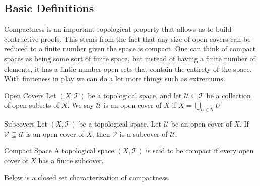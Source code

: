 \documentclass[a4paper]{article}
\begin{document}
\subsection{Basic Definitions}
Compactness is an important topological property that allows us to build contructive proofs. This stems from the fact that any size of open covers can be reduced to a finite number given the space is compact. One can think of compact spaces as being some sort of finite space, but instead of having a finite number of elements, it has a fintie number open sets that contain the entirety of the space. With finiteness in play we can do a lot more things such as extremums. 

\begin{defn}{Open Covers}{} Let $(X,\mathcal{T})$ be a topological space, and let $\mathcal{U}\subseteq\mathcal{T}$ be a collection of open subsets of $X$. We say $\mathcal{U}$ is an open cover of $X$ if $X=\bigcup_{U\in\mathcal{U}}U$
\end{defn}

\begin{defn}{Subcovers}{} Let $(X,\mathcal{T})$ be a topological space. Let $\mathcal{U}$ be an open cover of $X$. If $\mathcal{V}\subseteq\mathcal{U}$ is an open cover of $X$, then $\mathcal{V}$ is a subcover of $\mathcal{U}$. 
\end{defn}

\begin{defn}{Compact Space}{} A topological space $(X,\mathcal{T})$ is said to be compact if every open cover of $X$ has a finite subcover. 
\end{defn}

Below is a closed set characterization of compactness. 
\end{document}
